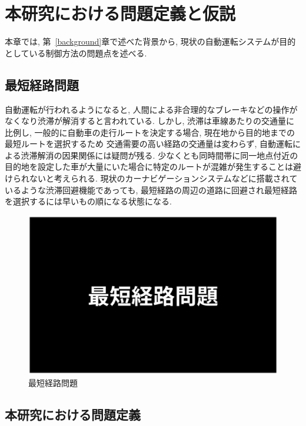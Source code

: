 \chapter{本研究における問題定義と仮説}
\label{issue}

本章では, 第~\ref{background}章で述べた背景から, 現状の自動運転システムが目的としている制御方法の問題点を述べる.

\section{最短経路問題}


自動運転が行われるようになると, 人間による非合理的なブレーキなどの操作がなくなり渋滞が解消すると言われている.
しかし, 渋滞は車線あたりの交通量に比例し, 一般的に自動車の走行ルートを決定する場合, 現在地から目的地までの最短ルートを選択するため
交通需要の高い経路の交通量は変わらず, 自動運転による渋滞解消の因果関係には疑問が残る.
少なくとも同時間帯に同一地点付近の目的地を設定した車が大量にいた場合に特定のルートが混雑が発生することは避けられないと考えられる.
現状のカーナビゲーションシステムなどに搭載されているような渋滞回避機能であっても, 最短経路の周辺の道路に回避され最短経路を選択するには早いもの順になる状態になる.




\begin{figure}[H]
    \centering  %
    \includegraphics[clip,width = 13.0cm]{assets/shorten_route.eps}
    \caption{最短経路問題}  \label{sample}
\end{figure}
  

\section{本研究における問題定義}

